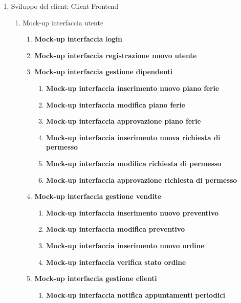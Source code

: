 \documentclass{article}
\begin{document}
    \begin{enumerate}
        \item Sviluppo del client: Client Frontend
        \begin{enumerate}
            \item Mock-up interfaccia utente
            \begin{enumerate}
                \item \textbf{Mock-up interfaccia login}
                \item \textbf{Mock-up interfaccia registrazione nuovo utente}
                \item \textbf{Mock-up interfaccia gestione dipendenti}
                \begin{enumerate}
                    \item \textbf{Mock-up interfaccia inserimento nuovo piano ferie}
                    \item \textbf{Mock-up interfaccia modifica piano ferie}
                    \item \textbf{Mock-up interfaccia approvazione piano ferie}
                    \item \textbf{Mock-up interfaccia inserimento nuova richiesta di permesso}
                    \item \textbf{Mock-up interfaccia modifica richiesta di permesso}
                    \item \textbf{Mock-up interfaccia approvazione richiesta di permesso}
                \end{enumerate}
                \item \textbf{Mock-up interfaccia gestione vendite}
                \begin{enumerate}
                    \item \textbf{Mock-up interfaccia inserimento nuovo preventivo}
                    \item \textbf{Mock-up interfaccia modifica preventivo}
                    \item \textbf{Mock-up interfaccia inserimento nuovo ordine}
                    \item \textbf{Mock-up interfaccia verifica stato ordine}
                \end{enumerate}
                \item \textbf{Mock-up interfaccia gestione clienti}
                \begin{enumerate}
                    \item \textbf{Mock-up interfaccia notifica appuntamenti periodici}

\end{enumerate}
\end{enumerate}
\end{enumerate}
\end{enumerate}
\end{document}

